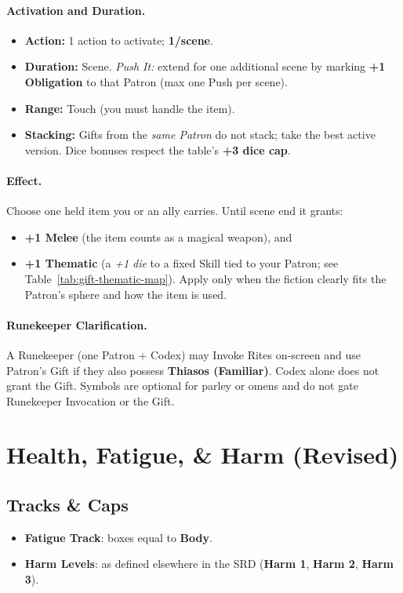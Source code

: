 \paragraph{Activation and Duration.}
\begin{itemize}
  \item \textbf{Action:} 1 action to activate; \textbf{1/scene}.
  \item \textbf{Duration:} Scene. \emph{Push It:} extend for one additional scene by marking \textbf{+1 Obligation} to that Patron (max one Push per scene).
  \item \textbf{Range:} Touch (you must handle the item).
  \item \textbf{Stacking:} Gifts from the \emph{same Patron} do not stack; take the best active version. Dice bonuses respect the table's \textbf{+3 dice cap}.
\end{itemize}

\paragraph{Effect.}
Choose one held item you or an ally carries. Until scene end it grants:
\begin{itemize}
  \item \textbf{+1 Melee} (the item counts as a magical weapon), and
  \item \textbf{+1 Thematic} (a \emph{+1 die} to a fixed Skill tied to your Patron; see Table~\ref{tab:gift-thematic-map}). Apply only when the fiction clearly fits the Patron's sphere and how the item is used.
\end{itemize}

\paragraph{Runekeeper Clarification.}
A Runekeeper (one Patron + Codex) may Invoke Rites on-screen and use Patron's Gift if they also possess \textbf{Thiasos (Familiar)}. Codex alone does not grant the Gift. Symbols are optional for parley or omens and do not gate Runekeeper Invocation or the Gift.

\section{Health, Fatigue, \& Harm (Revised)}
\label{sec:health-fatigue-harm-rev}

\subsection*{Tracks \& Caps}
\begin{itemize}
  \item \textbf{Fatigue Track}: boxes equal to \textbf{Body}.
  \item \textbf{Harm Levels}: as defined elsewhere in the SRD (\textbf{Harm 1}, \textbf{Harm 2}, \textbf{Harm 3}).
\end{itemize}

